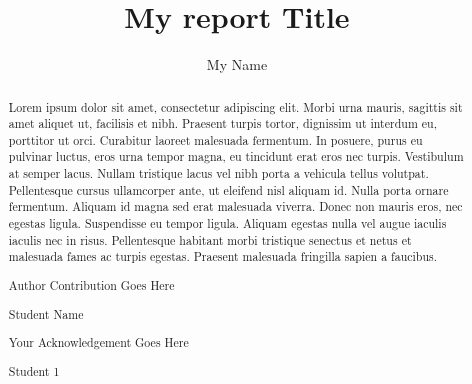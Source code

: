 \documentclass{fisatproject}
\title{My report Title}
\author{My Name}
\begin{document}
\maketitle
\makecert

\newpage
{}
\setcounter{page}{1}
\thispagestyle{plain}
\renewcommand\abstractname{ABSTRACT}
\begin{abstract}
\vspace{5cm}
Lorem ipsum dolor sit amet, consectetur adipiscing elit. Morbi urna mauris, sagittis sit amet aliquet ut, facilisis et nibh. Praesent turpis tortor, dignissim ut interdum eu, porttitor ut orci. Curabitur laoreet malesuada fermentum. In posuere, purus eu pulvinar luctus, eros urna tempor magna, eu tincidunt erat eros nec turpis. Vestibulum at semper lacus. Nullam tristique lacus vel nibh porta a vehicula tellus volutpat. Pellentesque cursus ullamcorper ante, ut eleifend nisl aliquam id. Nulla porta ornare fermentum. Aliquam id magna sed erat malesuada viverra. Donec non mauris eros, nec egestas ligula. Suspendisse eu tempor ligula. Aliquam egestas nulla vel augue iaculis iaculis nec in risus. Pellentesque habitant morbi tristique senectus et netus et malesuada fames ac turpis egestas. Praesent malesuada fringilla sapien a faucibus.
\end{abstract}



\newpage
\renewcommand\abstractname{Contribution by Author}
\thispagestyle{plain}
\begin{abstract}
\vspace{5cm}
Author Contribution  Goes Here
\vspace{1cm}
\begin{flushright}
Student Name
\end{flushright}
\end{abstract}

\newpage
\renewcommand\abstractname{ACKNOWLEDGMENT}
\thispagestyle{plain}
\begin{abstract}
\vspace{5cm}
Your Acknowledgement Goes Here
\vspace{1cm}
\begin{flushright}
Student 1
\end{flushright}
\end{abstract}
\newpage

\restoregeometry
\tableofcontents
\newpage

\cleardoublepage
{}
\listoffigures
\newpage
\end{document}
